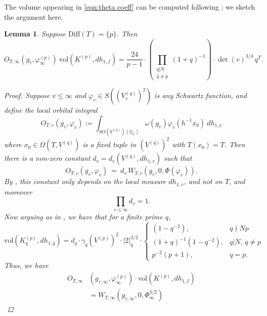\documentclass[reqno,oneside]{amsart}
\theoremstyle{plain}
\newtheorem{lemma}[theorem]{Lemma}
\theoremstyle{remark}
\numberwithin{theorem}{section}
\newcommand{\bbQ}{\mathbb Q}
\begin{document}
	The volume appearing in \eqref{eqn:theta coeff} can be computed following \cite[Lemma 5.3.9]{KRYbook}; we sketch the argument here.
	
	\begin{lemma} \label{lemma:local volumes}
		Suppose $\mathrm{Diff}(T) = \{p\}$. Then
		\begin{equation}
		O_{T,\infty}(g_{\tau}, \varphi^{(p)}_{\infty})  \ \mathrm{vol}(K^{(p)}, dh_{1,f}) = \frac{24}{p-1}    \cdot \left( \prod_{\substack{q|N \\ q \neq p}} (1+q)^{-1} \right) \cdot \det(v)^{3/4} \, q^T.
		\end{equation}
		\begin{proof}
			Suppose $v \leq \infty $ and $\varphi_v \in S((V^{(q)}_v)^2)$ is any Schwartz function, and define the local orbital integral
			\begin{equation}
			O_{T,v}(g_v, \varphi_v) :=  \int_{SO(V^{(q)})(\bbQ_v)}  \omega(g_v) \varphi_v(h^{-1} x_0) \   dh_{1,v}
			\end{equation}
			where $x_0 \in \Omega(T, V^{(q)})$ is a fixed tuple in $(V^{(q)})^2$ with $T(x_0) = T$.
			Then there is a non-zero constant $d_v = d_{v}(V^{(q)}, dh_{1,v} )$ such that
			\begin{equation}
			O_{T,v}(g_v, \varphi_v)  \ = \  d_{v} \, W_{T,v}(g_v, 0, \Phi(\varphi_v)).
			\end{equation}
			By \cite[Proposition 5.3.3]{KRYbook}, this constant only depends on the local measure $dh_{1,v}$, and not on $T$, and moreover
			\begin{equation}
			\prod_{v \leq \infty}d_v  = 1.
			\end{equation}
			Now arguing as in \cite[Lemma 5.3.9]{KRYbook}, we have that for a finite prime $q$,
			\begin{equation}
			\mathrm{vol}(K_q^{(p)}, dh_{1,q}) = d_q \cdot \gamma_q(V^{(p)})^2 \cdot |2|_{q}^{3/2}
			\cdot 	\begin{cases}
			(1 - q^{-2}), & 				q \nmid Np \\
			(1+q )^{-1} (1-q^{-2}),&		q |N, \,  q \neq p	 \\
			p^{-2} (p+1), &						 q = p.
			\end{cases}
			\end{equation}
			Thus, we have
			\begin{align*}
			O_{T,\infty}&(g_{\tau,\infty}, \varphi^{(p)}_{\infty}) \cdot 	\mathrm{vol}(K^{(p)}, dh_{1,f}) \\
			&=   W_{T, \infty}(g_{\tau, \infty}, 0, \Phi^{3/2}_{\infty})

\end{align*}
\end{proof}
\end{lemma}
\end{document}
